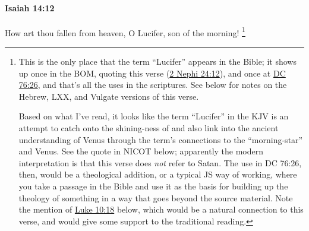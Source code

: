 		\paragraph{Isaiah 14:12} %
			\label{ISAIAH-14-12}
			\label{HELEL} %
			\label{HEOSPHOROS} %

			How art thou fallen from heaven, O Lucifer, son of the morning!%
				\footnote{%
					This is the only place that the term ``Lucifer'' appears in the Bible; it shows up once in the BOM, quoting this verse (\hyperref[2NEPHI-24-12]{2 Nephi 24:12}), and once at \hyperref[DC76-26]{DC 76:26}, and that's all the uses in the scriptures. See below for notes on the Hebrew, LXX, and Vulgate versions of this verse.
					
					Based on what I've read, it looks like the term ``Lucifer'' in the KJV is an attempt to catch onto the shining-ness of  and also link into the ancient understanding of Venus through the term's connections to the ``morning-star'' and Venus. See the quote in NICOT below; apparently the modern interpretation is that this verse does \textit{not} refer to Satan. The use in DC 76:26, then, would be a theological addition, or a typical JS way of working, where you take a passage in the Bible and use it as the basis for building up the theology of something in a way that goes beyond the source material. Note the mention of \hyperref[LUKE-10-18]{Luke 10:18} below, which would be a natural connection to this verse, and would give some support to the traditional reading.
					
}
